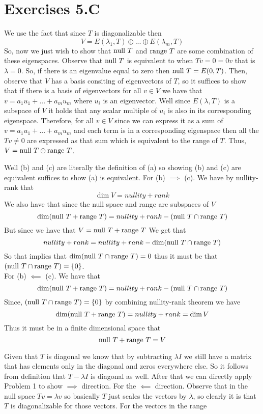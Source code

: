 \documentclass[10pt, twocolumn]{article}
\begin{document}
\section{Exercises 5.C}
\begin{q}[1]
    We use the fact that since $ T $ is diagonalizable then 
    $$ V = E(\lambda_1, T) \oplus ... \oplus E(\lambda_m, T) $$
    So, now we just wish to show that $ \text{null } T $ and $ \text{range } T $ are some combination of these eigenspaces.
    Observe that $ \text{null } T $ is equivalent to when $ Tv = 0 = 0v $ that is $ \lambda = 0 $. 
    So, if there is an eigenvalue equal to zero then $ \text{null } T = E(0, T) $.
    Then, observe that $ V $ has a basis consiting of eigenvectors of $ T $, so it suffices to show that if there is a basis of eigenvectors 
    for all $ v \in V $ we have that $ v = a_1u_1 + ... + a_m u_m $ where $ u_i $ is an eigenvector. 
    Well since $ E(\lambda, T ) $ is a subspace of $ V $ it holds that any scalar multiple of $ u_i $ is also in its corresponding eigenspace.
    Therefore, for all $ v \in V $ since we can express it as a sum of $ v = a_1 u_1 + ... + a_m u_m $ and each term is in a corresponding eigenspace 
    then all the $ Tv \neq 0 $ are expressed as that sum which is equivalent to the range of $ T $. 
    Thus, $ V = \text{null } T \oplus \text{range } T $. 
\end{q}
\begin{q}[3]
    Well (b) and (c) are literally the definition of (a) so showing (b) and (c) are equivalent suffices to show (a) is equivalent.
    For (b) $ \implies $ (c). 
    We have by nullity-rank that 
    $$ \dim V = nullity + rank $$
    We also have that since the null space and range are subspaces of $ V $
    $$ \dim (\text{null } T + \text{range } T) = nullity + rank - (\text{null } T \cap \text{range } T) $$
    But since we have that $ V = \text{null } T + \text{range } T $ We get that
    $$ nullity + rank = nullity + rank - \dim (\text{null } T \cap \text{range } T) $$
    So that implies that $\dim (\text{null } T \cap \text{range } T) = 0 $ thus it must be that $ (\text{null } T \cap \text{range } T) = \{0\} $. \\
    For (b) $ \impliedby $ (c). 
    We have that 
    $$ \dim (\text{null } T + \text{range } T) = nullity + rank - (\text{null } T \cap \text{range } T)$$
    Since, $ (\text{null } T \cap \text{range } T) = \{0\} $
    by combining nullity-rank theorem we have 
    $$ \dim (\text{null } T + \text{range } T) = nullity + rank = \dim V$$
    Thus it must be in a finite dimensional space that
    $$ \text{null } T +\text{range } T = V $$
\end{q}
\begin{q}[5]
    Given that $ T $ is diagonal we know that by subtracting $ \lambda I $ we still have a matrix that has elements only in the diagonal and zeros everywhere else. 
    So it follows from definition that $ T - \lambda I $ is diagonal as well. After that we can directly apply Problem 1 to show $ \implies $ direction.
    For the $ \impliedby $ direction. 
    Observe that in the null space $ Tv = \lambda v $ so basically $ T $ just scales the vectors by $ \lambda $, 
    so clearly it is that $ T $ is diagonalizable for those vectors. For the vectors in the range 
\end{q}
\end{document}
